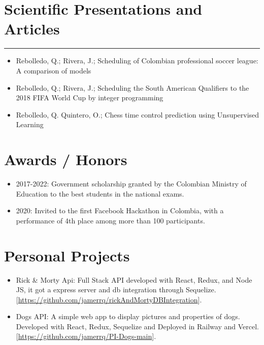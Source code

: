 \documentclass[]{rahulworld-resume}
\begin{document}
\begin{minipage}[t]{0.66\textwidth}
\section{Scientific Presentations and Articles}
\noindent\rule{12.5cm}{0.4pt}
\noindent
\begin{itemize}
    \item Rebolledo, Q.; Rivera, J.; Scheduling of Colombian professional soccer league: A comparison of models
    \item Rebolledo, Q.; Rivera, J.; Scheduling the South American Qualifiers to the 2018 FIFA World Cup by integer programming
    \item Rebolledo, Q. Quintero, O.; Chess time control prediction using Unsupervised Learning
\end{itemize}


\section{Awards / Honors}

\begin{itemize}
    \item 2017-2022: Government scholarship granted by the
    Colombian Ministry of Education to the best students in
    the national exams.
    \item 2020: Invited to the first Facebook Hackathon in Colombia,
    with a performance of 4th place among more than 100 participants.
\end{itemize}

\section{Personal Projects}



\begin{itemize}
    \item Rick \& Morty Api: Full Stack API developed with React, Redux, and Node JS, it got a express server and db integration through Sequelize.
    [\url{https://github.com/jamerrq/rickAndMortyDBIntegration}].

    \item Dogs API: A simple web app to display pictures and properties of dogs. Developed with React, Redux, Sequelize and Deployed in Railway and Vercel.
    [\url{https://github.com/jamerrq/PI-Dogs-main}].

\end{itemize}

\end{minipage}
\end{document}
